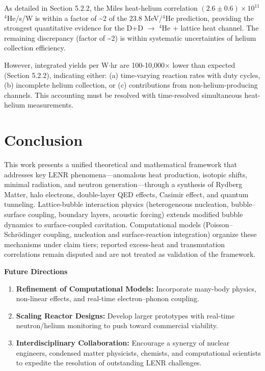 \documentclass[11pt,a4paper]{article}
\begin{document}
As detailed in Section 5.2.2, the Miles heat-helium correlation $(2.6 \pm 0.6) \times 10^{11}$ $^{4}$He/s/W is within a factor of \textasciitilde2 of the 23.8 MeV/$^{4}$He prediction, providing the strongest quantitative evidence for the D+D $\rightarrow$ $^{4}$He + lattice heat channel. The remaining discrepancy (factor of \textasciitilde2) is within systematic uncertainties of helium collection efficiency.

However, integrated yields per W$\cdot$hr are 100-10,000$\times$ lower than expected (Section 5.2.2), indicating either: (a) time-varying reaction rates with duty cycles, (b) incomplete helium collection, or (c) contributions from non-helium-producing channels. This accounting must be resolved with time-resolved simultaneous heat-helium measurements.

\section{Conclusion}

This work presents a unified theoretical and mathematical framework that addresses key LENR phenomena---anomalous heat production, isotopic shifts, minimal radiation, and neutron generation---through a synthesis of Rydberg Matter, halo electrons, double-layer QED effects, Casimir effect, and quantum tunneling. Lattice-bubble interaction physics (heterogeneous nucleation, bubble--surface coupling, boundary layers, acoustic forcing) extends modified bubble dynamics to surface-coupled cavitation. Computational models (Poisson--Schr\"{o}dinger coupling, nucleation and surface-reaction integration) organize these mechanisms under claim tiers; reported excess-heat and transmutation correlations remain disputed and are not treated as validation of the framework.

\textbf{Future Directions}

\begin{enumerate}
\def\labelenumi{\arabic{enumi}.}
\item
  \textbf{Refinement of Computational Models:} Incorporate many-body physics, non-linear effects, and real-time electron--phonon coupling.
\item
  \textbf{Scaling Reactor Designs:} Develop larger prototypes with real-time neutron/helium monitoring to push toward commercial viability.
\item
  \textbf{Interdisciplinary Collaboration:} Encourage a synergy of nuclear engineers, condensed matter physicists, chemists, and computational scientists to expedite the resolution of outstanding LENR challenges.
\end{enumerate}
\end{document}
